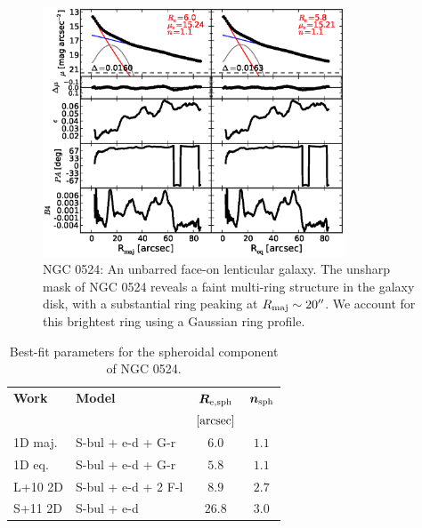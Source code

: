 \documentclass[preprint2]{emulateapj}
\newcommand{\fitfigurewidth}{0.8\textwidth}
\begin{document}
  \begin{figure}[h]
  \begin{center}
  \includegraphics[width=\fitfigurewidth]{images/n0524_1Dfit.eps}
  \caption{NGC 0524: 
  An unbarred face-on lenticular galaxy. 
  The unsharp mask of NGC 0524 reveals a faint multi-ring structure in the galaxy disk,
  with a substantial ring peaking at $R_{\rm maj} \sim 20''$.
  We account for this brightest ring using a Gaussian ring profile.
  }
  \end{center}
  \end{figure}

  \begin{table}[h]
  \small
  \caption{Best-fit parameters for the spheroidal component of NGC 0524.}
  \begin{center}
  \begin{tabular}{llcc}
  \hline
  {\bf Work} & {\bf Model}   & $\bm R_{\rm e,sph}$    & $\bm n_{\rm sph}$ \\
    &  &  $[\rm arcsec]$ & \\
  \hline
  1D maj. & S-bul + e-d + G-r & $6.0$  &  $1.1$ \\
  1D eq.  & S-bul + e-d + G-r & $5.8$  &  $1.1$ \\
  \hline
  L+10 2D      & S-bul + e-d + 2 F-l & $8.9$   &  $2.7$ \\
  S+11 2D      & S-bul + e-d	  & $26.8$  &  $3.0$ \\
  \hline
  \end{tabular}
  \end{center}
  \label{tab:n0524}
  \end{table}
\end{document}
